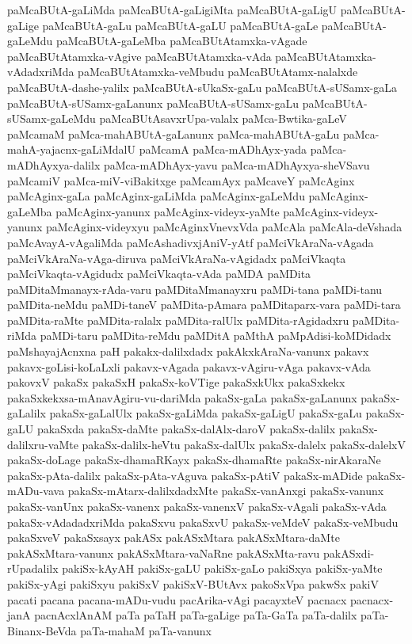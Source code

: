 {paMcaBUtA-gaLiMda
paMcaBUtA-gaLigiMta
paMcaBUtA-gaLigU
paMcaBUtA-gaLige
paMcaBUtA-gaLu
paMcaBUtA-gaLU
paMcaBUtA-gaLe
paMcaBUtA-gaLeMdu
paMcaBUtA-gaLeMba
paMcaBUtAtamxka-vAgade
paMcaBUtAtamxka-vAgive
paMcaBUtAtamxka-vAda
paMcaBUtAtamxka-vAdadxriMda
paMcaBUtAtamxka-veMbudu
paMcaBUtAtamx-nalalxde
paMcaBUtA-dashe-yalilx
paMcaBUtA-sUkaSx-gaLu
paMcaBUtA-sUSamx-gaLa
paMcaBUtA-sUSamx-gaLanunx
paMcaBUtA-sUSamx-gaLu
paMcaBUtA-sUSamx-gaLeMdu
paMcaBUtAsavxrUpa-valalx
paMca-Bwtika-gaLeV
paMcamaM
paMca-mahABUtA-gaLanunx
paMca-mahABUtA-gaLu
paMca-mahA-yajacnx-gaLiMdalU
paMcamA
paMca-mADhAyx-yada
paMca-mADhAyxya-dalilx
paMca-mADhAyx-yavu
paMca-mADhAyxya-sheVSavu
paMcamiV
paMca-miV-viBakitxge
paMcamAyx
paMcaveY
paMcAginx
paMcAginx-gaLa
paMcAginx-gaLiMda
paMcAginx-gaLeMdu
paMcAginx-gaLeMba
paMcAginx-yanunx
paMcAginx-videyx-yaMte
paMcAginx-videyx-yanunx
paMcAginx-videyxyu
paMcAginxVnevxVda
paMcAla
paMcAla-deVshada
paMcAvayA-vAgaliMda
paMcAshadivxjAniV-yAtf
paMciVkAraNa-vAgada
paMciVkAraNa-vAga-diruva
paMciVkAraNa-vAgidadx
paMciVkaqta
paMciVkaqta-vAgidudx
paMciVkaqta-vAda
paMDA
paMDita
paMDitaMmanayx-rAda-varu
paMDitaMmanayxru
paMDi-tana
paMDi-tanu
paMDita-neMdu
paMDi-taneV
paMDita-pAmara
paMDitaparx-vara
paMDi-tara
paMDita-raMte
paMDita-ralalx
paMDita-ralUlx
paMDita-rAgidadxru
paMDita-riMda
paMDi-taru
paMDita-reMdu
paMDitA
paMthA
paMpAdisi-koMDidadx
paMshayajAcnxna
paH
pakakx-dalilxdadx
pakAkxkAraNa-vanunx
pakavx
pakavx-goLisi-koLaLxli
pakavx-vAgada
pakavx-vAgiru-vAga
pakavx-vAda
pakovxV
pakaSx
pakaSxH
pakaSx-koVTige
pakaSxkUkx
pakaSxkekx
pakaSxkekxsa-mAnavAgiru-vu-dariMda
pakaSx-gaLa
pakaSx-gaLanunx
pakaSx-gaLalilx
pakaSx-gaLalUlx
pakaSx-gaLiMda
pakaSx-gaLigU
pakaSx-gaLu
pakaSx-gaLU
pakaSxda
pakaSx-daMte
pakaSx-dalAlx-daroV
pakaSx-dalilx
pakaSx-dalilxru-vaMte
pakaSx-dalilx-heVtu
pakaSx-dalUlx
pakaSx-dalelx
pakaSx-dalelxV
pakaSx-doLage
pakaSx-dhamaRKayx
pakaSx-dhamaRte
pakaSx-nirAkaraNe
pakaSx-pAta-dalilx
pakaSx-pAta-vAguva
pakaSx-pAtiV
pakaSx-mADide
pakaSx-mADu-vava
pakaSx-mAtarx-dalilxdadxMte
pakaSx-vanAnxgi
pakaSx-vanunx
pakaSx-vanUnx
pakaSx-vanenx
pakaSx-vanenxV
pakaSx-vAgali
pakaSx-vAda
pakaSx-vAdadadxriMda
pakaSxvu
pakaSxvU
pakaSx-veMdeV
pakaSx-veMbudu
pakaSxveV
pakaSxsayx
pakASx
pakASxMtara
pakASxMtara-daMte
pakASxMtara-vanunx
pakASxMtara-vaNaRne
pakASxMta-ravu
pakASxdi-rUpadalilx
pakiSx-kAyAH
pakiSx-gaLU
pakiSx-gaLo
pakiSxya
pakiSx-yaMte
pakiSx-yAgi
pakiSxyu
pakiSxV
pakiSxV-BUtAvx
pakoSxVpa
pakwSx
pakiV
pacati
pacana
pacana-mADu-vudu
pacArika-vAgi
pacayxteV
pacnacx
pacnacx-janA
pacnAcxlAnAM
paTa
paTaH
paTa-gaLige
paTa-GaTa
paTa-dalilx
paTa-Binanx-BeVda
paTa-mahaM
paTa-vanunx
}
